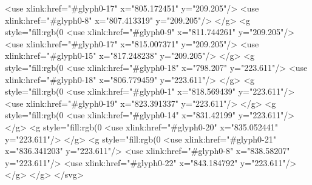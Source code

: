   <use xlink:href="#glyph0-17" x="805.172451" y="209.205"/>
  <use xlink:href="#glyph0-8" x="807.413319" y="209.205"/>
</g>
<g style="fill:rgb(0%
  <use xlink:href="#glyph0-9" x="811.744261" y="209.205"/>
  <use xlink:href="#glyph0-17" x="815.007371" y="209.205"/>
  <use xlink:href="#glyph0-15" x="817.248238" y="209.205"/>
</g>
<g style="fill:rgb(0%
  <use xlink:href="#glyph0-18" x="798.207" y="223.611"/>
  <use xlink:href="#glyph0-18" x="806.779459" y="223.611"/>
</g>
<g style="fill:rgb(0%
  <use xlink:href="#glyph0-1" x="818.569439" y="223.611"/>
  <use xlink:href="#glyph0-19" x="823.391337" y="223.611"/>
</g>
<g style="fill:rgb(0%
  <use xlink:href="#glyph0-14" x="831.42199" y="223.611"/>
</g>
<g style="fill:rgb(0%
  <use xlink:href="#glyph0-20" x="835.052441" y="223.611"/>
</g>
<g style="fill:rgb(0%
  <use xlink:href="#glyph0-21" x="836.341203" y="223.611"/>
  <use xlink:href="#glyph0-8" x="838.58207" y="223.611"/>
  <use xlink:href="#glyph0-22" x="843.184792" y="223.611"/>
</g>
</g>
</svg>
